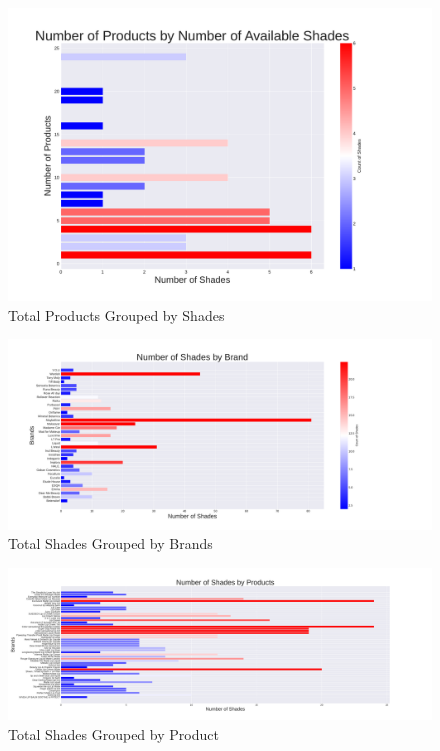 \documentclass{article}
\begin{document}
\begin{center}
    \begin{figure}[htbp]
        \centering
        \includegraphics[scale=0.4]{../images/TotalProductsByShades.pdf}
        \caption{Total Products Grouped by Shades}
        \label{Products_by_Shades}
    \end{figure}


    \begin{landscape}
        \begin{figure}[htbp]
            \centering
            \includegraphics[scale=0.55]{../images/TotalShadesByBrand.pdf}
            \caption{Total Shades Grouped by Brands}
            \label{Shades_by_Brands}
        \end{figure}
    \end{landscape}

    \begin{landscape}
        \begin{figure}[htbp]
            \centering
            \includegraphics[scale=0.49]{../images/TotalShadesByProduct.pdf}
            \caption{Total Shades Grouped by Product}
            \label{Shades_by_Product}
        \end{figure}
    \end{landscape}


\end{center}
\end{document}
